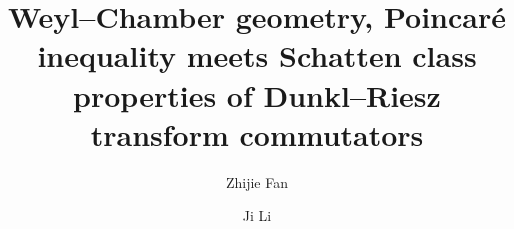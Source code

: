 \documentclass[12pt]{amsart}
\begin{document}
 \baselineskip 16.6pt
\hfuzz=6pt


\newtheorem{cl}{Claim}
\newtheorem{theorem}{Theorem}[section]
\newtheorem{proposition}[theorem]{Proposition}
\newtheorem{coro}[theorem]{Corollary}
\newtheorem{lemma}[theorem]{Lemma}
\newtheorem{definition}[theorem]{Definition}
\newtheorem{nota}[theorem]{Notation}
\newtheorem{assum}{Assumption}[section]
\newtheorem{example}[theorem]{Example}
\newtheorem{remark}[theorem]{Remark}
\renewcommand{\theequation}
{\thesection.\arabic{equation}}

\def\SL{\sqrt H}

\newcommand{\mar}[1]{{\marginpar{\sffamily{\scriptsize
        #1}}}}

\newcommand{\as}[1]{{\mar{AS:#1}}}
\newcommand{\cE}{\mathcal{E}}
\newcommand\R{\mathbb{R}}
\newcommand\RR{\mathbb{R}}
\newcommand\CC{\mathbb{C}}
\newcommand\D {{\rm Dunkl}}
\newcommand\NN{\mathbb{N}}
\newcommand\N {{\bf N}}
\newcommand\ZZ{\mathbb{Z}}
\newcommand\HH{\mathbb{H}}
\newcommand\Z{\mathbb{Z}}
\def\RN {\mathbb{R}^n}
\renewcommand\Re{\operatorname{Re}}
\renewcommand\Im{\operatorname{Im}}

\newcommand{\mc}{\mathcal}

\def\hs{\hspace{0.33cm}}
\newcommand{\la}{\alpha}
\newcommand{\eps}{\tau}
\newcommand{\pl}{\partial}
\newcommand{\supp}{{\rm supp}{\hspace{.05cm}}}
\newcommand{\x}{\times}
\newcommand{\lag}{\langle}
\newcommand{\rag}{\rangle}

\newcommand\wrt{\,{\rm d}}

\newcommand{\norm}[2]{|#1|_{#2}}
\newcommand{\Norm}[2]{\|#1\|_{#2}}

\title[Schatten class properties of Dunkl--Riesz transform commutators]{Weyl--Chamber geometry, Poincar\'e inequality meets Schatten class properties of Dunkl--Riesz transform commutators}



\author{Zhijie Fan}
\address{Zhijie Fan, School of Mathematical Sciences, South China Normal University, Guangzhou 510631, China}







\author{Ji Li}
\address{Ji Li, Department of Mathematics, Macquarie University,NSW2109, Australia}
\end{document}
